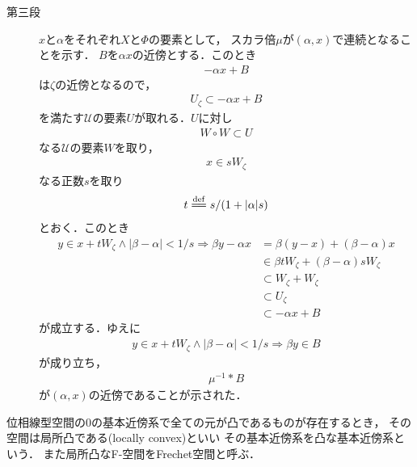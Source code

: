 \begin{sketch}
\begin{description}
			\item[第三段]
				$x$と$\alpha$をそれぞれ$X$と$\Phi$の要素として，
				スカラ倍$\mu$が$(\alpha,x)$で連続となることを示す．
				$B$を$\alpha x$の近傍とする．このとき
				\begin{align}
					-\alpha x + B
				\end{align}
				は$\zeta$の近傍となるので，
				\begin{align}
					U_\zeta \subset -\alpha x + B 
				\end{align}
				を満たす$\mathscr{U}$の要素$U$が取れる．$U$に対し
				\begin{align}
					W \circ W \subset U
				\end{align}
				なる$\mathscr{U}$の要素$W$を取り，
				\begin{align}
					x \in s W_\zeta
				\end{align}
				なる正数$s$を取り
				\begin{align}
					t \defeq s/(1+|\alpha|s)
				\end{align}
				とおく．このとき
				\begin{align}
					y \in x+t W_\zeta \wedge |\beta - \alpha| < 1/s
					\Longrightarrow \beta y - \alpha x
					&= \beta (y-x) + (\beta - \alpha)x \\
					&\in \beta t W_\zeta + (\beta - \alpha) s W_\zeta \\
					&\subset W_\zeta + W_\zeta \\
					&\subset U_\zeta \\
					&\subset -\alpha x + B
				\end{align}
				が成立する．ゆえに
				\begin{align}
					y \in x+t W_\zeta \wedge |\beta - \alpha| < 1/s
					\Longrightarrow \beta y \in B
				\end{align}
				が成り立ち，
				\begin{align}
					\mu^{-1} \ast B
				\end{align}
				が$(\alpha,x)$の近傍であることが示された．
				
		\end{description}
	\end{sketch}
	
	\begin{screen}
		\begin{dfn}
			位相線型空間の0の基本近傍系で全ての元が凸であるものが存在するとき，
			その空間は局所凸である(locally convex)といい
			その基本近傍系を凸な基本近傍系という．
			また局所凸なF-空間をFrechet空間と呼ぶ．
		\end{dfn}
	\end{screen}
	
